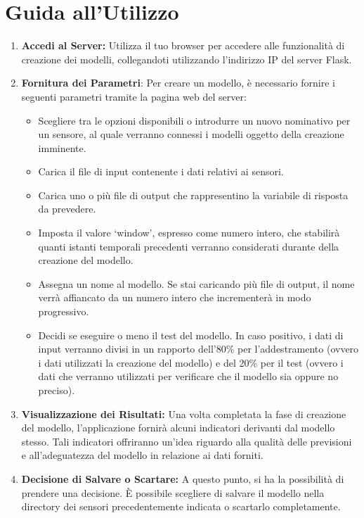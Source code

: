 \documentclass[a4paper,10pt]{article}
\begin{document}
\section{Guida all'Utilizzo}
\begin{enumerate}
  \item \textbf{Accedi al Server:} Utilizza il tuo browser per accedere alle funzionalità di creazione dei modelli, 
  collegandoti utilizzando l'indirizzo IP del server Flask.
  
  \item \textbf{Fornitura dei Parametri}: Per creare un modello, è necessario fornire i seguenti parametri tramite la pagina web del server:
  \begin{itemize}
    \item Scegliere tra le opzioni disponibili o introdurre un nuovo nominativo per un sensore, al quale verranno connessi i modelli oggetto della creazione imminente.
    \item Carica il file di input contenente i dati relativi ai sensori.
    \item Carica uno o più file di output che rappresentino la variabile di risposta da prevedere.
    \item Imposta il valore `window', espresso come numero intero, che stabilirà quanti istanti temporali precedenti verranno considerati durante della creazione del modello.
    \item Assegna un nome al modello. Se stai caricando più file di output, il nome verrà affiancato da un numero intero che incrementerà in modo progressivo.
    \item Decidi se eseguire o meno il test del modello. In caso positivo, i dati di input verranno divisi in un rapporto dell'80\% per l'addestramento 
    (ovvero i dati utilizzati la creazione del modello) e del 20\% per il test (ovvero i dati che verranno utilizzati per verificare che il modello sia oppure no preciso).
  \end{itemize}
  
  \item \textbf{Visualizzazione dei Risultati:} Una volta completata la fase di creazione del modello, l'applicazione fornirà alcuni indicatori derivanti dal modello stesso. 
  Tali indicatori offriranno un'idea riguardo alla qualità delle previsioni e all'adeguatezza del modello in relazione ai dati forniti.

  \item \textbf{Decisione di Salvare o Scartare:} A questo punto, si ha la possibilità di prendere una decisione. 
  È possibile scegliere di salvare il modello nella directory dei sensori precedentemente indicata o scartarlo completamente.
  

\end{enumerate}
\end{document}
